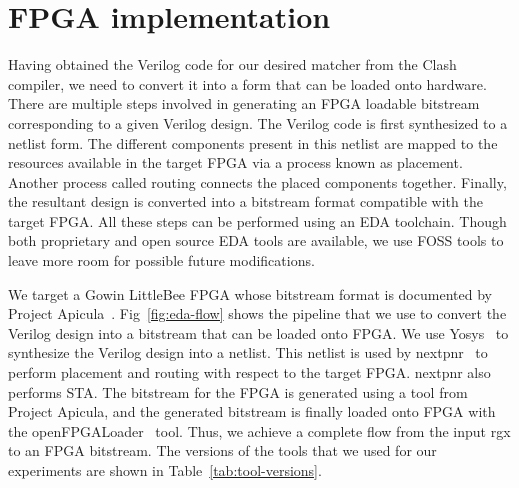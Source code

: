 
%
%
%


\section{FPGA implementation} \label{sec:eda}
Having obtained the Verilog code for our desired matcher from the
Clash compiler, we need to convert it into a form that can be loaded
onto hardware.
There are multiple steps involved in generating an \gls{FPGA} loadable
bitstream corresponding to a given Verilog design.
The Verilog code is first synthesized to a netlist form.  The
different components present in this netlist are mapped to the
resources available in the target \gls{FPGA} via a process known as
placement.
Another process called routing connects the placed components
together.
Finally, the resultant design is converted into a bitstream format
compatible with the target \gls{FPGA}.
All these steps can be performed using an \gls{EDA} toolchain.
Though both proprietary and open source \gls{EDA} tools are available,
we use \gls{FOSS} tools to leave more room for possible future
modifications.

We target a Gowin LittleBee \gls{FPGA} whose bitstream format is
documented by Project Apicula~\cite{projapicula}.
Fig~\ref{fig:eda-flow} shows the pipeline that we use to convert
the Verilog design into a bitstream that can be loaded onto
\gls{FPGA}.
%
We use Yosys~\cite{wolf2013yosys} to synthesize the Verilog design
into a netlist. This netlist is used by nextpnr~\cite{shah2019yosys}
to perform placement and routing with respect to the target
\gls{FPGA}.
nextpnr also performs \gls{STA}.
The bitstream for the \gls{FPGA} is generated using a tool from
Project Apicula, and the generated bitstream is finally loaded onto
\gls{FPGA} with the openFPGALoader~\cite{Tang2019openFPGA} tool.
Thus, we achieve a complete flow from the input \gls{rgx} to an
\gls{FPGA} bitstream.
The versions of the tools that we used for our experiments are shown
in Table~\ref{tab:tool-versions}.
  
